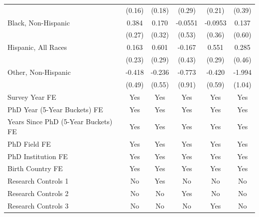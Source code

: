 \begin{table}[htbp]
\begin{tabular}{l*{5}{c}}
  &      (0.16)         &      (0.18)         &      (0.29)         &      (0.21)         &      (0.39)         \\
[1em]
Black, Non-Hispanic&       0.384         &       0.170         &     -0.0551         &     -0.0953         &       0.137         \\
  &      (0.27)         &      (0.32)         &      (0.53)         &      (0.36)         &      (0.60)         \\
[1em]
Hispanic, All Races&       0.163         &       0.601\sym{**} &      -0.167         &       0.551\sym{*}  &       0.285         \\
  &      (0.23)         &      (0.29)         &      (0.43)         &      (0.29)         &      (0.46)         \\
[1em]
Other, Non-Hispanic&      -0.418         &      -0.236         &      -0.773         &      -0.420         &      -1.994\sym{*}  \\
  &      (0.49)         &      (0.55)         &      (0.91)         &      (0.59)         &      (1.04)         \\
[1em]
Survey Year FE&         Yes         &         Yes         &         Yes         &         Yes         &         Yes         \\
[1em]
PhD Year (5-Year Buckets) FE&         Yes         &         Yes         &         Yes         &         Yes         &         Yes         \\
[1em]
Years Since PhD (5-Year Buckets) FE&         Yes         &         Yes         &         Yes         &         Yes         &         Yes         \\
[1em]
PhD Field FE&         Yes         &         Yes         &         Yes         &         Yes         &         Yes         \\
[1em]
PhD Institution FE&         Yes         &         Yes         &         Yes         &         Yes         &         Yes         \\
[1em]
Birth Country FE&         Yes         &         Yes         &         Yes         &         Yes         &         Yes         \\
\hline
Research Controls 1&          No         &         Yes         &          No         &          No         &          No         \\
Research Controls 2&          No         &          No         &         Yes         &          No         &          No         \\
Research Controls 3&          No         &          No         &          No         &         Yes         &          No         \\

\end{tabular}
\end{table}
